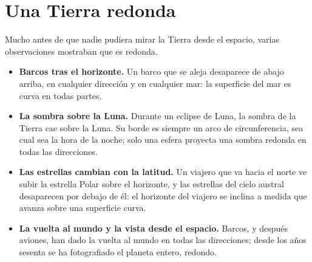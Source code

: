 \section{Una Tierra redonda}

Mucho antes de que nadie pudiera mirar la Tierra desde el espacio, varias
observaciones mostraban que es redonda.
\begin{itemize}
  \item \textbf{Barcos tras el horizonte.} Un barco que se aleja desaparece
        de abajo arriba, en cualquier dirección y en cualquier mar: la
        superficie del mar es curva en todas partes.
  \item \textbf{La sombra sobre la Luna.} Durante un eclipse de Luna, la
        sombra de la Tierra cae sobre la Luna. Su borde es siempre un arco de
        circunferencia, sea cual sea la hora de la noche; solo una esfera
        proyecta una sombra redonda en todas las direcciones.
  \item \textbf{Las estrellas cambian con la latitud.} Un viajero que va
        hacia el norte ve subir la estrella Polar sobre el horizonte, y las
        estrellas del cielo austral desaparecen por debajo de él: el
        horizonte del viajero se inclina a medida que avanza sobre una
        superficie curva.
  \item \textbf{La vuelta al mundo y la vista desde el espacio.} Barcos, y
        después aviones, han dado la vuelta al mundo en todas las
        direcciones; desde los años sesenta se ha fotografiado el planeta
        entero, redondo.
\end{itemize}

